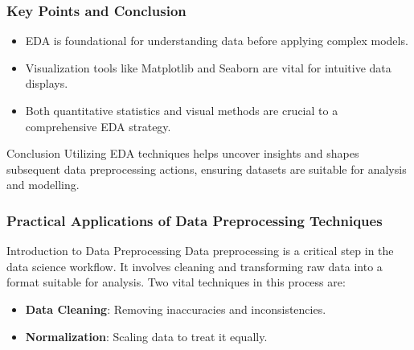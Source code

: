 \documentclass{beamer}
\begin{document}
\begin{frame}[fragile]
    \frametitle{Key Points and Conclusion}
    \begin{itemize}
        \item EDA is foundational for understanding data before applying complex models.
        \item Visualization tools like Matplotlib and Seaborn are vital for intuitive data displays.
        \item Both quantitative statistics and visual methods are crucial to a comprehensive EDA strategy.
    \end{itemize}

    \begin{block}{Conclusion}
        Utilizing EDA techniques helps uncover insights and shapes subsequent data preprocessing actions, ensuring datasets are suitable for analysis and modelling.
    \end{block}
\end{frame}

\begin{frame}[fragile]
    \frametitle{Practical Applications of Data Preprocessing Techniques}
    \begin{block}{Introduction to Data Preprocessing}
        Data preprocessing is a critical step in the data science workflow. It involves cleaning and transforming raw data into a format suitable for analysis. Two vital techniques in this process are:
        \begin{itemize}
            \item \textbf{Data Cleaning}: Removing inaccuracies and inconsistencies.
            \item \textbf{Normalization}: Scaling data to treat it equally.
        \end{itemize}
    \end{block}
\end{frame}
\end{document}
